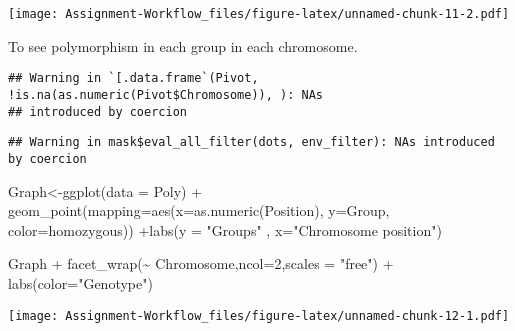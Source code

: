 \documentclass[
]{article}
\newenvironment{Shaded}{\begin{snugshade}}{\end{snugshade}}
\newcommand{\AttributeTok}[1]{\textcolor[rgb]{0.77,0.63,0.00}{#1}}
\newcommand{\DecValTok}[1]{\textcolor[rgb]{0.00,0.00,0.81}{#1}}
\newcommand{\FunctionTok}[1]{\textcolor[rgb]{0.00,0.00,0.00}{#1}}
\newcommand{\NormalTok}[1]{#1}
\newcommand{\OtherTok}[1]{\textcolor[rgb]{0.56,0.35,0.01}{#1}}
\newcommand{\SpecialCharTok}[1]{\textcolor[rgb]{0.00,0.00,0.00}{#1}}
\newcommand{\StringTok}[1]{\textcolor[rgb]{0.31,0.60,0.02}{#1}}
\begin{document}
\texttt{[image: Assignment-Workflow\_files/figure-latex/unnamed-chunk-11-2.pdf]}

To see polymorphism in each group in each chromosome.

\begin{Shaded}
\end{Shaded}

\begin{verbatim}
## Warning in `[.data.frame`(Pivot, !is.na(as.numeric(Pivot$Chromosome)), ): NAs
## introduced by coercion
\end{verbatim}

\begin{Shaded}
\end{Shaded}

\begin{verbatim}
## Warning in mask$eval_all_filter(dots, env_filter): NAs introduced by coercion
\end{verbatim}

\begin{Shaded}
\begin{Highlighting}[]
\NormalTok{Graph}\OtherTok{\textless{}{-}}\FunctionTok{ggplot}\NormalTok{(}\AttributeTok{data =}\NormalTok{ Poly) }\SpecialCharTok{+} \FunctionTok{geom\_point}\NormalTok{(}\AttributeTok{mapping=}\FunctionTok{aes}\NormalTok{(}\AttributeTok{x=}\FunctionTok{as.numeric}\NormalTok{(Position), }\AttributeTok{y=}\NormalTok{Group, }\AttributeTok{color=}\NormalTok{homozygous)) }\SpecialCharTok{+}\FunctionTok{labs}\NormalTok{(}\AttributeTok{y =} \StringTok{"Groups"}\NormalTok{ , }\AttributeTok{x=}\StringTok{"Chromosome position"}\NormalTok{)}

\NormalTok{Graph }\SpecialCharTok{+} \FunctionTok{facet\_wrap}\NormalTok{(}\SpecialCharTok{\textasciitilde{}}\NormalTok{ Chromosome,}\AttributeTok{ncol=}\DecValTok{2}\NormalTok{,}\AttributeTok{scales =} \StringTok{"free"}\NormalTok{) }\SpecialCharTok{+} \FunctionTok{labs}\NormalTok{(}\AttributeTok{color=}\StringTok{"Genotype"}\NormalTok{)}
\end{Highlighting}
\end{Shaded}

\texttt{[image: Assignment-Workflow\_files/figure-latex/unnamed-chunk-12-1.pdf]}
\end{document}
